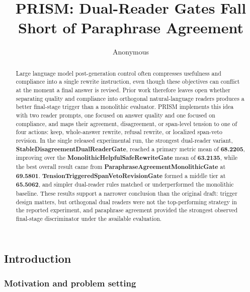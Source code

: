 \documentclass{article}
\title{PRISM: Dual-Reader Gates Fall Short of Paraphrase Agreement}
\author{Anonymous}
\begin{document}
\begin{abstract}
Large language model post-generation control often compresses usefulness and compliance into a single rewrite instruction, even though these objectives can conflict at the moment a final answer is revised. Prior work therefore leaves open whether separating quality and compliance into orthogonal natural-language readers produces a better final-stage trigger than a monolithic evaluator. PRISM implements this idea with two reader prompts, one focused on answer quality and one focused on compliance, and maps their agreement, disagreement, or span-level tension to one of four actions: keep, whole-answer rewrite, refusal rewrite, or localized span-veto revision. In the single released experimental run, the strongest dual-reader variant, \textbf{StableDisagreementDualReaderGate}, reached a primary metric mean of \textbf{68.2205}, improving over the \textbf{MonolithicHelpfulSafeRewriteGate} mean of \textbf{63.2135}, while the best overall result came from \textbf{ParaphraseAgreementMonolithicGate} at \textbf{69.5801}. \textbf{TensionTriggeredSpanVetoRevisionGate} formed a middle tier at \textbf{65.5062}, and simpler dual-reader rules matched or underperformed the monolithic baseline. These results support a narrower conclusion than the original draft: trigger design matters, but orthogonal dual readers were not the top-performing strategy in the reported experiment, and paraphrase agreement provided the strongest observed final-stage discriminator under the available evaluation.
\end{abstract}

\maketitle

\subsection{Introduction}

\label{sec:introduction}

\subsubsection{Motivation and problem setting}

\label{sec:motivation_and_problem_setting}
\end{document}
